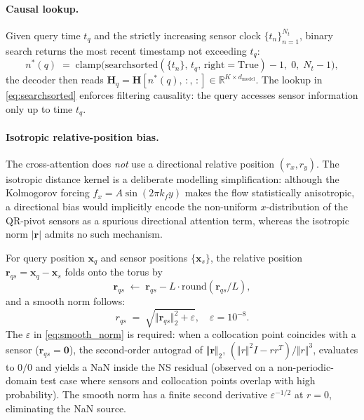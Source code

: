 \paragraph{Causal lookup.}
Given query time $t_q$ and the strictly increasing sensor clock $\{t_n\}_{n=1}^{N_t}$, binary search returns the most recent timestamp not exceeding $t_q$:
\begin{equation}
    \label{eq:searchsorted}
    n^*(q) \;=\; \mathrm{clamp}\!\big(\mathrm{searchsorted}(\{t_n\},\,t_q,\,\mathrm{right=True}) - 1,\;0,\;N_t-1\big),
\end{equation}
the decoder then reads $\mathbf{H}_q = \mathbf{H}[n^*(q),\,:,\,:] \in \mathbb{R}^{K\times d_{\text{model}}}$. The lookup in \eqref{eq:searchsorted} enforces filtering causality: the query accesses sensor information only up to time $t_q$.

\paragraph{Isotropic relative-position bias.}
The cross-attention does \emph{not} use a directional relative position $(r_x, r_y)$. The isotropic distance kernel is a deliberate modelling simplification: although the Kolmogorov forcing $f_x = A\sin(2\pi k_f y)$ makes the flow statistically anisotropic, a directional bias would implicitly encode the non-uniform $x$-distribution of the QR-pivot sensors as a spurious directional attention term, whereas the isotropic norm $|\mathbf{r}|$ admits no such mechanism.

For query position $\mathbf{x}_q$ and sensor positions $\{\mathbf{x}_s\}$, the relative position $\mathbf{r}_{qs} = \mathbf{x}_q - \mathbf{x}_s$ folds onto the torus by
\begin{equation*}
    \mathbf{r}_{qs} \;\leftarrow\; \mathbf{r}_{qs} - L\cdot\mathrm{round}(\mathbf{r}_{qs}/L),
\end{equation*}
and a smooth norm follows:
\begin{equation}
    \label{eq:smooth_norm}
    r_{qs} \;=\; \sqrt{\Vert\mathbf{r}_{qs}\Vert_2^2 + \varepsilon},\quad \varepsilon = 10^{-8}.
\end{equation}
The $\varepsilon$ in \eqref{eq:smooth_norm} is required: when a collocation point coincides with a sensor ($\mathbf{r}_{qs}=\mathbf{0}$), the second-order autograd of $\Vert\mathbf{r}\Vert_2$, $(\Vert r\Vert^2 I - rr^T)/\Vert r\Vert^3$, evaluates to $0/0$ and yields a NaN inside the NS residual (observed on a non-periodic-domain test case where sensors and collocation points overlap with high probability). The smooth norm has a finite second derivative $\varepsilon^{-1/2}$ at $r = 0$, eliminating the NaN source.

